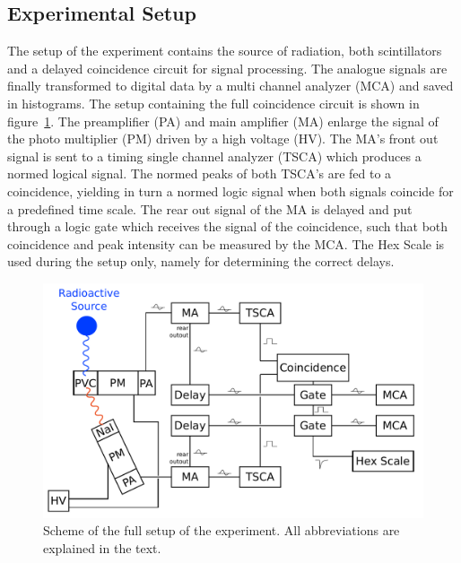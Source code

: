\subsection{Experimental Setup}
\label{sec:label}
The setup of the experiment contains the source of radiation, both scintillators and a delayed coincidence circuit for 
signal processing. The analogue signals are finally transformed to digital data by a multi channel analyzer (MCA) and 
saved in histograms. The setup containing the full coincidence circuit is shown in figure~\ref{fig:setup}. The 
preamplifier (PA) and main amplifier (MA) enlarge the signal of the photo multiplier (PM) driven by a high voltage (HV).
The MA's front out signal is sent to a timing single channel analyzer (TSCA) which produces a normed logical signal. 
The normed peaks of both TSCA's are fed to a coincidence, yielding in turn a normed logic signal when both signals 
coincide for a predefined time scale.
The rear out signal of the MA is delayed and put through a logic gate which receives the signal of the coincidence, such 
that both coincidence and peak intensity can be measured by the MCA. The Hex Scale is used during the setup only, namely
for determining the correct delays.

\begin{figure}[htpb]
    \centering
    \includegraphics[width=0.8\linewidth]{figures/setup}
    \caption{
        Scheme of the full setup of the experiment. All abbreviations are explained in the text.
        }
    \label{fig:setup}
\end{figure}


